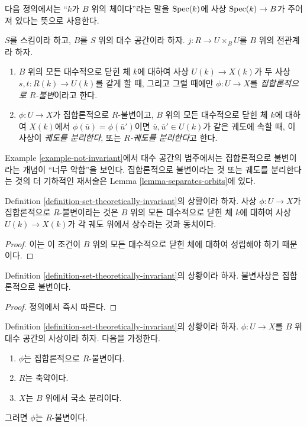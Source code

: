 \noindent
다음 정의에서는 “$k$가 $B$ 위의 체이다”라는 말을
$\mathop{\mathrm{Spec}}(k)$에 사상 $\mathop{\mathrm{Spec}}(k) \to B$가 주어져 있다는 뜻으로 사용한다.

\begin{definition}
\label{definition-set-theoretically-invariant}
$S$를 스킴이라 하고, $B$를 $S$ 위의 대수 공간이라 하자.
$j : R \to U \times_B U$를 $B$ 위의 전관계라 하자.
\begin{enumerate}
\item $B$ 위의 모든 대수적으로 닫힌 체 $k$에 대하여
사상 $U(k) \to X(k)$가 두 사상 $s, t : R(k) \to U(k)$를 같게
할 때, 그리고 그럴 때에만 $\phi : U \to X$를
{\it 집합론적으로 $R$-불변}이라고 한다.
\item $\phi : U \to X$가 집합론적으로 $R$-불변이고,
$B$ 위의 모든 대수적으로 닫힌 체 $k$에 대하여 $X(k)$에서
$\phi(\overline{u}) = \phi(\overline{u}')$이면
$\overline{u}, \overline{u}' \in U(k)$가 같은 궤도에 속할 때,
이 사상이 {\it 궤도를 분리한다}, 또는 {\it $R$-궤도를 분리한다}고 한다.
\end{enumerate}
\end{definition}

\noindent
Example \ref{example-not-invariant}에서 대수 공간의 범주에서는
집합론적으로 불변이라는 개념이 “너무 약함”을 보인다.
집합론적으로 불변이라는 것 또는 궤도를 분리한다는 것의
더 기하적인 재서술은 Lemma \ref{lemma-separates-orbits}에 있다.

\begin{lemma}
\label{lemma-set-theoretic-invariant}
Definition \ref{definition-set-theoretically-invariant}의 상황이라 하자.
사상 $\phi : U \to X$가 집합론적으로 $R$-불변이라는 것은
$B$ 위의 모든 대수적으로 닫힌 체 $k$에 대하여 사상
$U(k) \to X(k)$가 각 궤도 위에서 상수라는 것과 동치이다.
\end{lemma}

\begin{proof}
이는 이 조건이 $B$ 위의 모든 대수적으로 닫힌 체에 대하여
성립해야 하기 때문이다.
\end{proof}

\begin{lemma}
\label{lemma-invariant-set-theoretically-invariant}
Definition \ref{definition-set-theoretically-invariant}의 상황이라 하자.
불변사상은 집합론적으로 불변이다.
\end{lemma}

\begin{proof}
정의에서 즉시 따른다.
\end{proof}

\begin{lemma}
\label{lemma-set-theoretically-invariant-invariant-when-reduced}
Definition \ref{definition-set-theoretically-invariant}의 상황이라 하자.
$\phi : U \to X$를 $B$ 위 대수 공간의 사상이라 하자. 다음을 가정한다.
\begin{enumerate}
\item $\phi$는 집합론적으로 $R$-불변이다.
\item $R$는 축약이다.
\item $X$는 $B$ 위에서 국소 분리이다.
\end{enumerate}
그러면 $\phi$는 $R$-불변이다.
\end{lemma}

